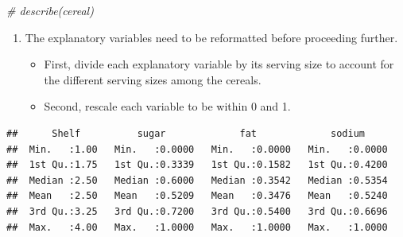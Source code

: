 \documentclass[11pt,]{article}
\newenvironment{Shaded}{\begin{snugshade}}{\end{snugshade}}
\newcommand{\KeywordTok}[1]{\textcolor[rgb]{0.13,0.29,0.53}{\textbf{#1}}}
\newcommand{\DataTypeTok}[1]{\textcolor[rgb]{0.13,0.29,0.53}{#1}}
\newcommand{\StringTok}[1]{\textcolor[rgb]{0.31,0.60,0.02}{#1}}
\newcommand{\CommentTok}[1]{\textcolor[rgb]{0.56,0.35,0.01}{\textit{#1}}}
\newcommand{\ControlFlowTok}[1]{\textcolor[rgb]{0.13,0.29,0.53}{\textbf{#1}}}
\newcommand{\OperatorTok}[1]{\textcolor[rgb]{0.81,0.36,0.00}{\textbf{#1}}}
\newcommand{\NormalTok}[1]{#1}
\providecommand{\tightlist}{%
  \setlength{\itemsep}{0pt}\setlength{\parskip}{0pt}}
\begin{document}
\begin{Shaded}
\begin{Highlighting}[]
\CommentTok{# describe(cereal)}
\end{Highlighting}
\end{Shaded}

\begin{enumerate}
\def\labelenumi{\alph{enumi}.}
\tightlist
\item
  The explanatory variables need to be reformatted before proceeding
  further.

  \begin{itemize}
  \item
    First, divide each explanatory variable by its serving size to
    account for the different serving sizes among the cereals.
  \item
    Second, rescale each variable to be within 0 and 1.
  \end{itemize}
\end{enumerate}

\begin{Shaded}
\end{Shaded}

\begin{verbatim}
##      Shelf          sugar             fat             sodium      
##  Min.   :1.00   Min.   :0.0000   Min.   :0.0000   Min.   :0.0000  
##  1st Qu.:1.75   1st Qu.:0.3339   1st Qu.:0.1582   1st Qu.:0.4200  
##  Median :2.50   Median :0.6000   Median :0.3542   Median :0.5354  
##  Mean   :2.50   Mean   :0.5209   Mean   :0.3476   Mean   :0.5240  
##  3rd Qu.:3.25   3rd Qu.:0.7200   3rd Qu.:0.5400   3rd Qu.:0.6696  
##  Max.   :4.00   Max.   :1.0000   Max.   :1.0000   Max.   :1.0000
\end{verbatim}
\end{document}
